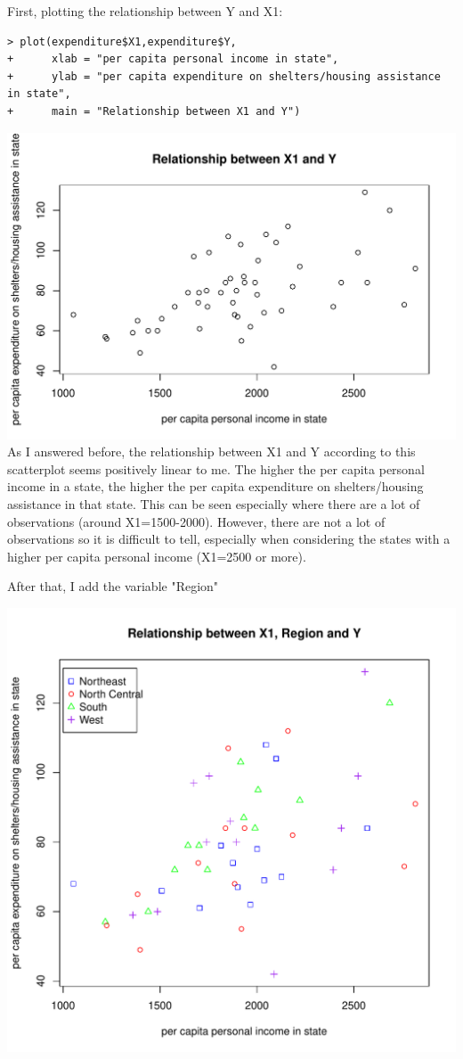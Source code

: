 \documentclass[12pt,letterpaper]{article}
\begin{document}
\begin{itemize}
First, plotting the relationship between Y and X1:
\begin{verbatim}
> plot(expenditure$X1,expenditure$Y, 
+      xlab = "per capita personal income in state",
+      ylab = "per capita expenditure on shelters/housing assistance in state", 
+      main = "Relationship between X1 and Y") 
\end{verbatim}
\includegraphics[width=\textwidth,height=\textheight,keepaspectratio]{Plot_X1_y}
As I answered before, the relationship between X1 and Y according to this scatterplot seems positively linear to me. The higher the per capita personal income in a state, the higher the per capita expenditure on shelters/housing assistance in that state. This can be seen especially where there are a lot of observations (around X1=1500-2000). However, there are not a lot of observations so it is difficult to tell, especially when considering the states with a higher per capita personal income (X1=2500 or more).


After that, I add the variable "Region"

\includegraphics[width=\textwidth,height=\textheight,keepaspectratio]{Plot_X1_Region_Y}
\end{itemize}
\end{document}
